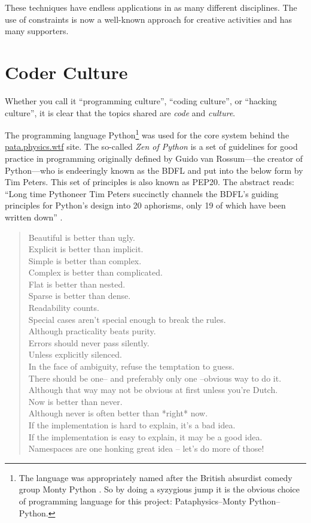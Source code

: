 These techniques have endless applications in as many different disciplines. The use of constraints is now a well-known approach for creative activities and has many supporters.


\section{Coder Culture}
\label{s:culture}

Whether you call it ``programming culture'', ``coding culture'', or ``hacking culture'', it is clear that the topics shared are \emph{code} and \emph{culture}.

The programming language Python\footnote{The language was appropriately named after the British absurdist comedy group Monty Python \autocite{Python2016}. So by doing a syzygious jump it is the obvious choice of programming language for this project: Pataphysics--Monty Python--Python.} was used for the core system behind the \url{pata.physics.wtf} site. The so-called \textit{Zen of Python} is a set of guidelines for good practice in programming originally defined by Guido van Rossum---the creator of Python---who is endeeringly known as the \ac{BDFL} and put into the below form by Tim Peters. This set of principles is also known as \acs{PEP}20. The abstract reads: ``Long time Pythoneer Tim Peters succinctly channels the \ac{BDFL}'s guiding principles for Python's design into 20 aphorisms, only 19 of which have been written down'' \autocite*{PEP20}.

\begin{quotation}
  Beautiful is better than ugly.\\
  Explicit is better than implicit.\\
  Simple is better than complex.\\
  Complex is better than complicated.\\
  Flat is better than nested.\\
  Sparse is better than dense.\\
  Readability counts.\\
  Special cases aren't special enough to break the rules.\\
  Although practicality beats purity.\\
  Errors should never pass silently.\\
  Unless explicitly silenced.\\
  In the face of ambiguity, refuse the temptation to guess.\\
  There should be one-- and preferably only one --obvious way to do it.\\
  Although that way may not be obvious at first unless you're Dutch.\\
  Now is better than never.\\
  Although never is often better than *right* now.\\
  If the implementation is hard to explain, it's a bad idea.\\
  If the implementation is easy to explain, it may be a good idea.\\
  Namespaces are one honking great idea -- let's do more of those!
\end{quotation}

